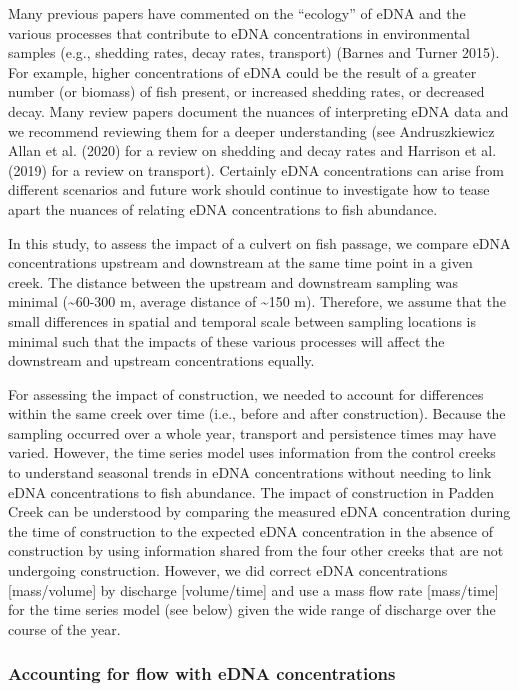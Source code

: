 \documentclass[
]{article}
\begin{document}
Many previous papers have commented on the ``ecology'' of eDNA and the
various processes that contribute to eDNA concentrations in
environmental samples (e.g., shedding rates, decay rates, transport)
(Barnes and Turner 2015). For example, higher concentrations of eDNA
could be the result of a greater number (or biomass) of fish present, or
increased shedding rates, or decreased decay. Many review papers
document the nuances of interpreting eDNA data and we recommend
reviewing them for a deeper understanding (see Andruszkiewicz Allan et
al. (2020) for a review on shedding and decay rates and Harrison et al.
(2019) for a review on transport). Certainly eDNA concentrations can
arise from different scenarios and future work should continue to
investigate how to tease apart the nuances of relating eDNA
concentrations to fish abundance.

In this study, to assess the impact of a culvert on fish passage, we
compare eDNA concentrations upstream and downstream at the same time
point in a given creek. The distance between the upstream and downstream
sampling was minimal (\textasciitilde60-300 m, average distance of
\textasciitilde150 m). Therefore, we assume that the small differences
in spatial and temporal scale between sampling locations is minimal such
that the impacts of these various processes will affect the downstream
and upstream concentrations equally.

For assessing the impact of construction, we needed to account for
differences within the same creek over time (i.e., before and after
construction). Because the sampling occurred over a whole year,
transport and persistence times may have varied. However, the time
series model uses information from the control creeks to understand
seasonal trends in eDNA concentrations without needing to link eDNA
concentrations to fish abundance. The impact of construction in Padden
Creek can be understood by comparing the measured eDNA concentration
during the time of construction to the expected eDNA concentration in
the absence of construction by using information shared from the four
other creeks that are not undergoing construction. However, we did
correct eDNA concentrations {[}mass/volume{]} by discharge
{[}volume/time{]} and use a mass flow rate {[}mass/time{]} for the time
series model (see below) given the wide range of discharge over the
course of the year.

\hypertarget{accounting-for-flow-with-edna-concentrations}{%
\subsubsection{Accounting for flow with eDNA
concentrations}\label{accounting-for-flow-with-edna-concentrations}}
\end{document}
